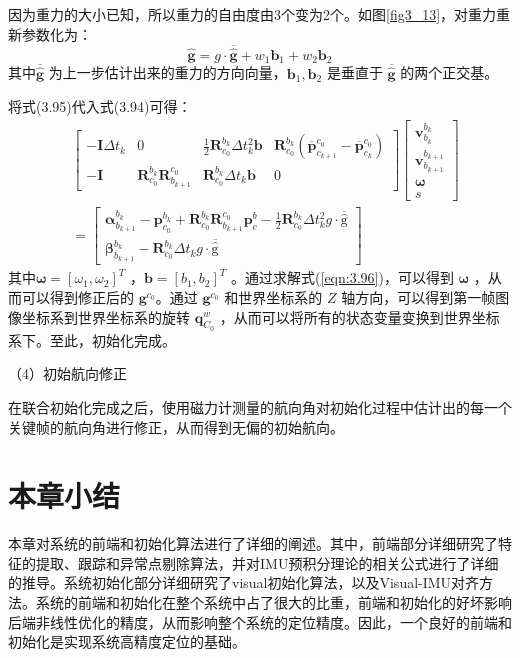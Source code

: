因为重力的大小已知，所以重力的自由度由3个变为2个。如图\ref{fig3_13}，对重力重新参数化为：
\begin{equation}
\label{eqn:3.95}
\hat{\mathbf{g}} = g \cdot \overline{\hat{\mathbf{g}}} +w_{1} \mathbf{b}_{1}+w_{2} \mathbf{b}_{2}
\end{equation}
其中$\overline{\hat{\mathbf{g}}} $ 为上一步估计出来的重力的方向向量，$\mathbf{b}_1, \mathbf{b}_2 $ 是垂直于 $\overline{\hat{\mathbf{g}}} $ 的两个正交基。

将式(3.95)代入式(3.94)可得：
\begin{equation}
\label{eqn:3.96}
\begin{aligned}
& \left[ \begin{array}{cccc}
- \mathbf{I} \Delta t_{k} & 0 & \frac{1}{2} \mathbf{R}_{c_{0}}^{b_{k}} \Delta t_{k}^{2} \mathbf{b} & \mathbf{R}_{c_{0}}^{b_{k}}(\overline{\mathbf{p}}_{c_{k+1}}^{c_{0}}-\overline{\mathbf{p}}_{c_{k}}^{c_{0}}) \\
{- \mathbf{ I}} & {\mathbf{R}_{c_{0}}^{b_{k}} \mathbf{R}_{b_{k+1}}^{c_{0}}} & {\mathbf{R}_{c_{0}}^{b_{k}} \Delta t_{k}} \mathbf{b}  & {0}
\end{array}\right] 
\left[ \begin{array}{c}
{\mathbf{v}_{b_{k}}^{b_{k}}} \\ {\mathbf{v}_{b_{k+1}}^{b_{k+1}}} \\ \bm{\omega} \\s
\end{array}\right] \\
&=\left[ \begin{array}{c}
\bm{\alpha}_{b_{k+1}}^{b_{k}}-\mathbf{p}_{c_{0}}^{b_{k}} + \mathbf{R}^{b_k}_{c_0}\mathbf{R}_{b_{k+1}}^{c_{0}} \mathbf{p}_{c}^{b} -\frac{1}{2} \mathbf{R}_{c_{0}}^{b_{k}} \Delta t_{k}^{2} g \cdot \overline{\hat{\mathrm{g}}} \\
{\bm{\beta}_{b_{k+1}}^{b_{k}}} - \mathbf{R}_{c_{0}}^{b_{k}} \Delta t_{k} g\cdot \overline{\hat{\mathrm{g}}} 
\end{array}\right]
\end{aligned}
\end{equation}
其中$\bm{\omega} =\left[\omega_{1}, \omega_{2}\right]^{T} $ ，$\mathbf{b} =\left[b_{1}, b_{2}\right]^{T} $ 。通过求解式(\ref{eqn:3.96})，可以得到 $\bm{\omega} $ ，从而可以得到修正后的 $\mathbf{g}^{c_{0}} $。通过 $\mathbf{g}^{c_{0}} $ 和世界坐标系的 $Z$ 轴方向，可以得到第一帧图像坐标系到世界坐标系的旋转 $\mathbf{q}_{C_{0}}^{w} $ ，从而可以将所有的状态变量变换到世界坐标系下。至此，初始化完成。

（4）初始航向修正

在联合初始化完成之后，使用磁力计测量的航向角对初始化过程中估计出的每一个关键帧的航向角进行修正，从而得到无偏的初始航向。
\section{本章小结}
本章对系统的前端和初始化算法进行了详细的阐述。其中，前端部分详细研究了特征的提取、跟踪和异常点剔除算法，并对IMU预积分理论的相关公式进行了详细的推导。系统初始化部分详细研究了visual初始化算法，以及Visual-IMU对齐方法。系统的前端和初始化在整个系统中占了很大的比重，前端和初始化的好坏影响后端非线性优化的精度，从而影响整个系统的定位精度。因此，一个良好的前端和初始化是实现系统高精度定位的基础。